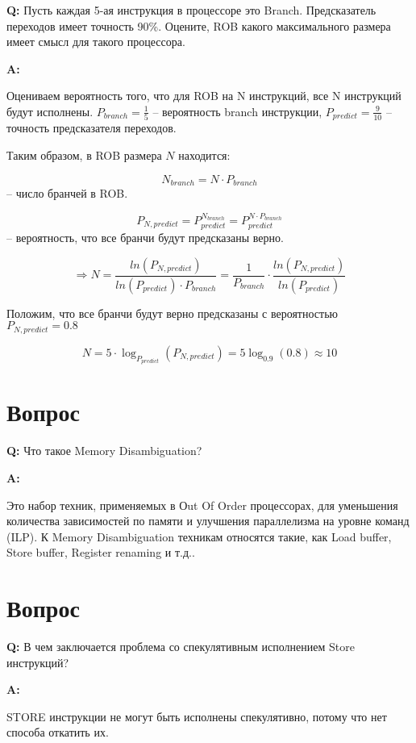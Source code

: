 \documentclass[12pt, letterpaper]{article}
\begin{document}
\textbf{Q: } Пусть каждая 5-ая инструкция в процессоре это Branch. Предсказатель переходов имеет точность 90\%. Оцените, ROB какого максимального размера имеет смысл для такого процессора.

\textbf{A: }

Оцениваем вероятность того, что для ROB на N инструкций, все N инструкций будут исполнены.
$P_{branch} = \frac{1}{5}$ -- вероятность branch инструкции, $P_{predict} = \frac{9}{10}$ -- точность предсказателя переходов.

Таким образом, в ROB размера $N$ находится:

\[ N_{branch} = N \cdot P_{branch} \]
-- число бранчей в ROB.

\[ P_{N,predict} = P_{predict}^{N_{branch}} = P_{predict}^{N \cdot P_{branch}} \]
-- вероятность, что все бранчи будут предсказаны верно.

\[ \Rightarrow N = \frac{ln(P_{N,predict})}{ln(P_{predict}) \cdot P_{branch}} = \frac{1}{P_{branch}} \cdot \frac{ln(P_{N,predict})}{ln(P_{predict})}  \]

Положим, что все бранчи будут верно предсказаны с вероятностью $P_{N,predict} = 0.8$

\[ N = 5 \cdot \log_{P_{predict}}(P_{N,predict}) = 5 \log_{0.9}(0.8) \approx 10  \]

\newpage

\section{Вопрос}

\textbf{Q: }  Что такое Memory Disambiguation?

\textbf{A: }

Это набор техник, применяемых в Оut Of Order процессорах, для уменьшения количества зависимостей по памяти и улучшения параллелизма на уровне команд (ILP).
К Memory Disambiguation техникам относятся такие, как Load buffer, Store buffer, Register renaming и т.д..

\newpage

\section{Вопрос}

\textbf{Q: } В чем заключается проблема со спекулятивным исполнением Store
инструкций?

\textbf{A: }

STORE инструкции не могут быть исполнены спекулятивно, потому что нет способа откатить их.
\end{document}
